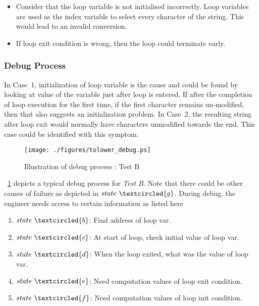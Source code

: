 \begin{itemize}

\item [Case 1:] Consider that the loop variable is not initialised incorrectly. Loop variables are used as the index variable to select every character of the string. This would lead to an invalid conversion. \label{algo:tolow:case1}

\item [Case 2:] If loop exit condition is wrong, then the loop could terminate early. \label{algo:tolow:case2}
\end{itemize}

\subsubsection{Debug Process}

In Case~1, initialization of loop variable is the cause and could be found by looking at value of the variable just after loop is entered. If after the completion of loop execution for the first time, if the first character remains un-modified, then that also suggests an initialization problem.
In Case~2, the resulting string after loop exit would normally have characters unmodified towards the end. This case could be identified with this symptom.

\begin{figure}[h]
\centering
\texttt{[image: ./figures/tolower\_debug.ps]}
\caption{Illustration of debug process : Test B} 
\label{fig:tolower_debug.ps}
\end{figure}

\figurename{~\ref{fig:tolower_debug.ps}} depicts a typical debug process for {\it Test B}. Note that there could be other causes of failure as depicted in $state~\textcircled{g}$. During debug, the engineer needs access to certain information as listed here

\begin{enumerate}
\item $state~\textcircled{b}$: Find address of loop var.
\item $state~\textcircled{c}$: At start of loop, check initial value of loop var.
\item $state~\textcircled{d}$: When the loop exited, what was the value of loop var.
\item $state~\textcircled{e}$: Need computation values of loop exit condition.
\item $state~\textcircled{f}$: Need computation values of loop init condition.
\end{enumerate}

